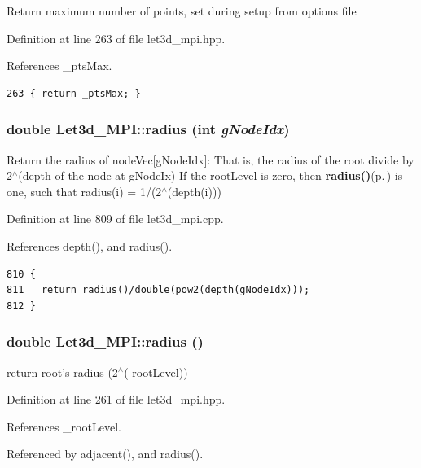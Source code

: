 Return maximum number of points, set during setup from options file 

Definition at line 263 of file let3d\_\-mpi.hpp.

References \_\-pts\-Max.

\footnotesize\begin{verbatim}263 { return _ptsMax; }
\end{verbatim}\normalsize 


\subsubsection{\setlength{\rightskip}{0pt plus 5cm}double Let3d\_\-MPI::radius (int {\em g\-Node\-Idx})}\label{classLet3d__MPI_c1534d5f7ba6030886668befb2b472c0_c1534d5f7ba6030886668befb2b472c0}


Return the radius of node\-Vec[g\-Node\-Idx]: That is, the radius of the root divide by 2$^\wedge$(depth of the node at g\-Node\-Ix) If the root\-Level is zero, then {\bf radius()}{\rm (p.\,\pageref{classLet3d__MPI_703550342372334b492a37f2f4379409_703550342372334b492a37f2f4379409})} is one, such that radius(i) = 1/(2$^\wedge$(depth(i))) 

Definition at line 809 of file let3d\_\-mpi.cpp.

References depth(), and radius().

\footnotesize\begin{verbatim}810 {
811   return radius()/double(pow2(depth(gNodeIdx)));
812 }
\end{verbatim}\normalsize 


\subsubsection{\setlength{\rightskip}{0pt plus 5cm}double Let3d\_\-MPI::radius ()\hspace{0.3cm}{\tt  [inline]}}\label{classLet3d__MPI_703550342372334b492a37f2f4379409_703550342372334b492a37f2f4379409}


return root's radius (2$^\wedge$(-root\-Level)) 

Definition at line 261 of file let3d\_\-mpi.hpp.

References \_\-root\-Level.

Referenced by adjacent(), and radius().

